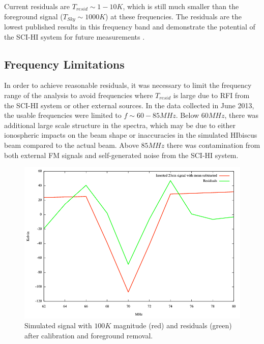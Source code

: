 Current residuals are $T_{resid} \sim 1-10K$, which is still much smaller than the foreground signal ($T_{Sky} \sim 1000K$) at these frequencies. The residuals are the lowest published results in this frequency band and demonstrate the potential of the SCI-HI system for future measurements \cite{Voytek_2014}. 


\subsection{Frequency Limitations}

In order to achieve reasonable residuals, it was necessary to limit the frequency range of the analysis to avoid frequencies where $T_{resid}$ is large due to RFI from the SCI-HI system or other external sources. In the data collected in June 2013, the usable frequencies were limited to $f \sim 60-85 MHz$. Below $60 MHz$, there was additional large scale structure in the spectra, which may be due to either ionospheric impacts on the beam shape or inaccuracies in the simulated HIbiscus beam compared to the actual beam. Above $85 MHz$ there was contamination from both external FM signals and self-generated noise from the SCI-HI system. 

\begin{figure}[htb]
\begin{center}
\includegraphics[width=0.9\linewidth]{Data_analysis/figures/100_K_21cm_signal.png}
\caption{Simulated \cm signal with $100 K$ magnitude (red) and residuals (green) after calibration and foreground removal. }
\label{Fig:100K_sim}
\end{center}
\end{figure}



